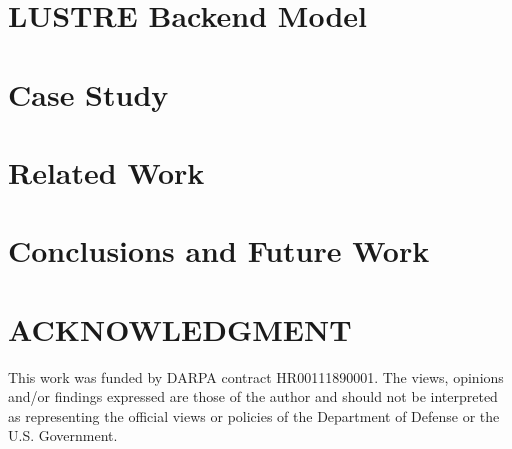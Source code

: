 \documentclass[runningheads]{llncs}
\begin{document}
\section{LUSTRE Backend Model	}
\label{lustre}


\section{Case Study}
\label{case-study}


\section{Related Work}
\label{rw}


\section{Conclusions and Future Work}
\label{conclusion}


\section{ACKNOWLEDGMENT}

This work was funded by DARPA contract HR00111890001. The
views, opinions and/or findings expressed are those of the author
and should not be interpreted as representing the official views or
policies of the Department of Defense or the U.S. Government.

%
%
%


%
\end{document}
